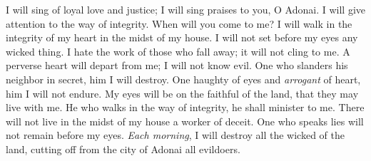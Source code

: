 \begin{biblechapter} %
 I will sing of loyal love and justice; 
I will sing praises to you, O Adonai.
\verse I will give attention to the way of integrity. 
When will you come to me? 
I will walk in the integrity of my heart 
in the midst of my house.
\verse I will not set before my eyes 
any wicked thing. 
I hate the work of those who fall away; 
it will not cling to me.
\verse A perverse heart will depart from me; 
I will not know evil.
\verse One who slanders his neighbor in secret, 
him I will destroy. 
One haughty of eyes and \textit{arrogant} of heart, 
him I will not endure.
\verse My eyes will be on the faithful of the land, 
that they may live with me. 
He who walks in the way of integrity, 
he shall minister to me.
\verse There will not live in the midst of my house 
a worker of deceit. 
One who speaks lies 
will not remain before my eyes.
\verse \textit{Each morning}, 
I will destroy all the wicked of the land, 
cutting off from the city of Adonai all evildoers.
\end{biblechapter}

